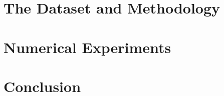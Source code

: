 \documentclass[UKenglish]{book}
\begin{document}
\chapter{The Dataset and Methodology}\label{chap:methodology}


\chapter{Numerical Experiments}\label{chap:numerical_experiments}


%
%
%
%
%

%

%

% 
% 
% 



\chapter{Conclusion}\label{chap:conclusion}

\backmatter{}


% 
\end{document}
